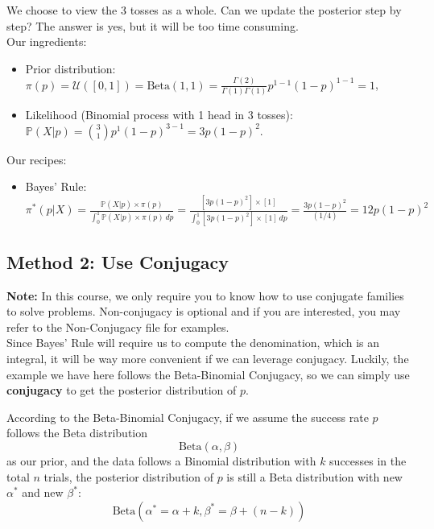 \documentclass{article}
\def\dsst{\displaystyle}
\begin{document}
We choose to view the 3 tosses as a whole. Can we update the posterior step by step? The answer is yes, but it will be too time consuming. \\

Our ingredients:\\
\begin{itemize}
\item Prior distribution: $\pi(p)=\mathcal{U}([0, 1]) = \text{Beta}(1, 1) = \dsst\frac{\Gamma(2)}{\Gamma(1)\Gamma(1)}p^{1-1}(1-p)^{1-1} = 1$,\\
\item Likelihood (Binomial process with 1 head in 3 tosses):  $\mathbb{P}(X|p) = \dsst \binom{3}{1}p^1(1-p)^{3-1} = 3p(1-p)^2$.
\end{itemize}

Our recipes:
\begin{itemize}
\item Bayes' Rule:	$\pi^*(p|X) =  \dsst \frac{\mathbb{P}(X|p)\times \pi(p)}{\dsst \int_0^1 \mathbb{P}(X|p)\times \pi(p)\, dp} =\dsst  \frac{[3p(1-p)^2]\times [1]}{\dsst \int_0^1 [3p(1-p)^2]\times [1]\, dp} = \frac{3p(1-p)^2}{(1/4)} = 12p(1-p)^2 $
\end{itemize} 

\subsection{Method 2: Use Conjugacy}

\textbf{Note:} In this course, we only require you to know how to use conjugate families to solve problems. Non-conjugacy is optional and if you are interested, you may refer to the Non-Conjugacy file for examples.\\

Since Bayes' Rule will require us to compute the denomination, which is an integral, it will be way more convenient if we can leverage conjugacy. Luckily, the example we have here follows the Beta-Binomial Conjugacy, so we can simply use \textbf{conjugacy} to get the posterior distribution of $p$. \\
\begin{displayquote}
According to the Beta-Binomial Conjugacy, if we assume the success rate $p$ follows the Beta distribution\\
$$ \text{Beta}(\alpha, \beta) $$
as our prior, and the data follows a Binomial distribution with $k$ successes in the total $n$ trials, the posterior distribution of $p$ is still a Beta distribution with new $\alpha^*$ and new $\beta^*$:\\
$$ \text{Beta}(\alpha^* = \alpha + k, \beta^* = \beta + (n-k)) $$
\end{displayquote}
\end{document}

